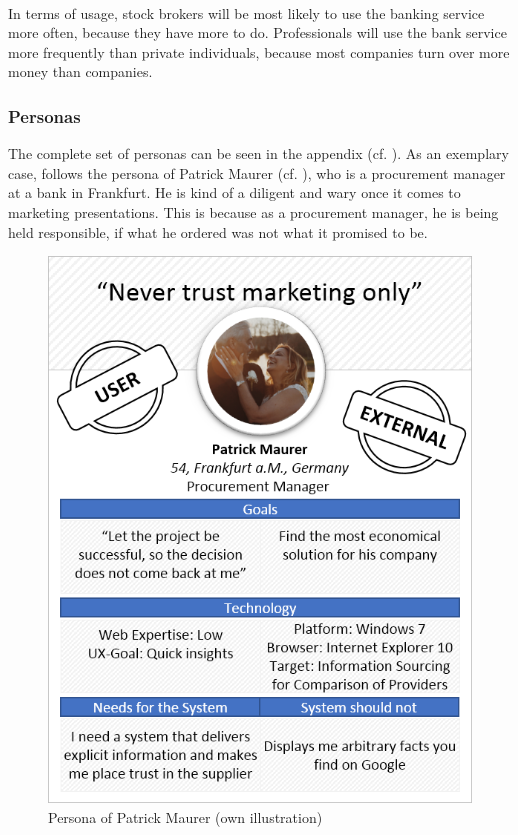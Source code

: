 \paragraph{} In terms of usage, stock brokers will be most likely to use the banking service more often, because they have more to do. Professionals will use the bank service more frequently than private individuals, because most companies turn over more money than companies. 

\subsubsection{Personas}
The complete set of personas can be seen in the appendix (cf. \cpagerefrange{}{}). As an exemplary case, follows the persona of Patrick Maurer (cf. ), who is a procurement manager at a bank in Frankfurt. He is kind of a diligent and wary once it comes to marketing presentations. This is because as a procurement manager, he is being held responsible, if what he ordered was not what it promised to be. 

\begin{figure}
    \centering
    \includegraphics[height=.5\textheight]{img/diagrams/personas/customer1.png}
    \caption[Persona of Patrick Maurer]{Persona of Patrick Maurer (own illustration)}
    \label{fig:PatrickMaurer}
\end{figure}


